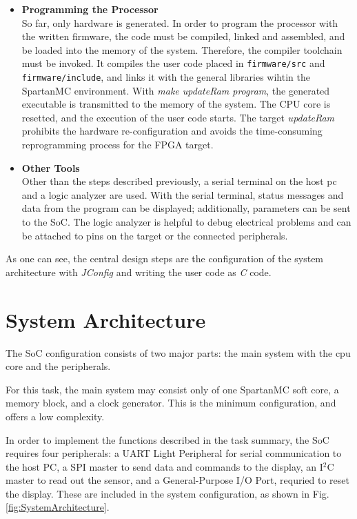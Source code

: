 \begin{itemize}
\item \textbf{Programming the Processor} \hfill \\
So far, only hardware is generated. In order to program the processor with the written 
firmware, the code must be compiled, linked and assembled, and be loaded into the memory
of the system. Therefore, the compiler toolchain must be invoked. It compiles the user code
placed in \texttt{firmware/src} and \texttt{firmware/include}, and links it with the 
general libraries wihtin the SpartanMC environment. With \emph{make updateRam program},
the generated executable is transmitted to the memory of the system. The CPU core is 
resetted, and the execution of the user code starts. The target \emph{updateRam} prohibits
the hardware re-configuration and avoids the time-consuming reprogramming process for 
the FPGA target.\\
\item \textbf{Other Tools}\hfill \\
Other than the steps described previously, a serial terminal on the host pc and a logic
analyzer are used. With the serial terminal, status messages and data from the program
can be displayed; additionally, parameters can be sent to the SoC. The logic analyzer 
is helpful to debug electrical problems and can be attached to pins on the target or the 
connected peripherals.
\end{itemize}

As one can see, the central design steps are the configuration of the system architecture
with \emph{JConfig} and writing the user code as \emph{C} code.

\section{System Architecture}
\label{sec:systemArchitecture}
The SoC configuration consists of two major parts: the main system with the cpu core 
and the peripherals. 

For this task, the main system may consist only of one SpartanMC soft core, a memory
block, and a clock generator. This is the minimum configuration, and offers a low complexity.

In order to implement the functions described in the task summary, the SoC requires four 
peripherals: a UART Light Peripheral for serial communication to the host PC, a SPI master 
to send data and commands to the display, an I$^{2}$C master to read out the sensor, 
and a General-Purpose I/O Port, requried to reset the display. These are included in the 
system configuration, as shown in Fig. \ref{fig:SystemArchitecture}.


